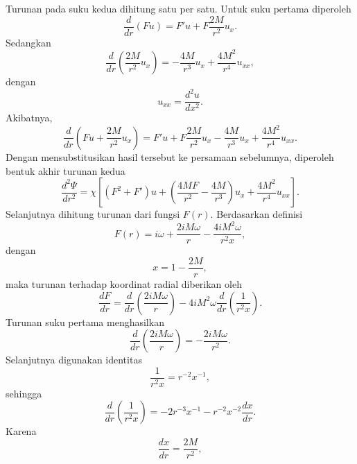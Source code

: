 Turunan pada suku kedua dihitung satu per satu. Untuk suku pertama diperoleh
\begin{equation}
    \frac{d}{dr}(Fu) = F'u + F\frac{2M}{r^2}u_x.
\end{equation}
Sedangkan
\begin{equation}
    \frac{d}{dr} \left( \frac{2M}{r^2}u_x \right) = -\frac{4M}{r^3}u_x + \frac{4M^2}{r^4}u_{xx},
\end{equation}
dengan
\begin{equation}
    u_{xx} = \frac{d^2u}{dx^2}.
\end{equation}
Akibatnya,
\begin{equation}
    \frac{d}{dr} \left( Fu + \frac{2M}{r^2}u_x \right) = F'u + F\frac{2M}{r^2}u_x - \frac{4M}{r^3}u_x + \frac{4M^2}{r^4}u_{xx}.
\end{equation}
Dengan mensubstitusikan hasil tersebut ke persamaan sebelumnya, diperoleh bentuk akhir turunan kedua
\begin{equation}
    \boxed{ \frac{d^2\Psi}{dr^2} = \chi \left[ (F^2+F')u + \left( \frac{4MF}{r^2} - \frac{4M}{r^3} \right)u_x + \frac{4M^2}{r^4}u_{xx} \right]. }
\end{equation}
Selanjutnya dihitung turunan dari fungsi $F(r)$. Berdasarkan definisi
\begin{equation}
    F(r) = i\omega + \frac{2iM\omega}{r} - \frac{4iM^2\omega}{r^2x},
\end{equation}
dengan
\begin{equation}
    x=1-\frac{2M}{r},
\end{equation}
maka turunan terhadap koordinat radial diberikan oleh
\begin{equation}
    \frac{dF}{dr} = \frac{d}{dr} \left( \frac{2iM\omega}{r} \right) - 4iM^2\omega \frac{d}{dr} \left( \frac{1}{r^2x} \right).
\end{equation}
Turunan suku pertama menghasilkan
\begin{equation}
    \frac{d}{dr} \left( \frac{2iM\omega}{r} \right) = -\frac{2iM\omega}{r^2}.
\end{equation}
Selanjutnya digunakan identitas
\begin{equation}
    \frac{1}{r^2x} = r^{-2}x^{-1},
\end{equation}
sehingga
\begin{equation}
    \frac{d}{dr} \left( \frac{1}{r^2x} \right) = -2r^{-3}x^{-1} - r^{-2}x^{-2} \frac{dx}{dr}.
\end{equation}
Karena
\begin{equation}
    \frac{dx}{dr} = \frac{2M}{r^2},
\end{equation}
